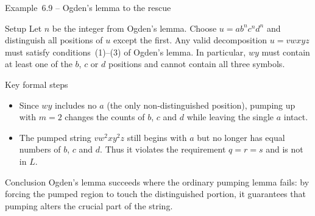\begin{frame}[t]{Example 6.9 – Ogden’s lemma to the rescue}
  \begin{tblock}{Setup}
    Let $n$ be the integer from Ogden’s lemma.  Choose
    $u = a b^n c^n d^n$ and distinguish all positions of $u$ except the
    first.  Any valid decomposition $u = v w x y z$ must satisfy
    conditions (1)–(3) of Ogden’s lemma.  In particular, $w y$ must
    contain at least one of the $b$, $c$ or $d$ positions and cannot
    contain all three symbols.
  \end{tblock}
  \begin{tblock}{Key formal steps}
    \begin{itemize}
      \item Since $w y$ includes no $a$ (the only non‑distinguished
        position), pumping up with $m=2$ changes the counts of $b$, $c$
        and $d$ while leaving the single $a$ intact.
      \item The pumped string $v w^2 x y^2 z$ still begins with $a$ but
        no longer has equal numbers of $b$, $c$ and $d$.  Thus it
        violates the requirement $q=r=s$ and is not in $L$.
    \end{itemize}
  \end{tblock}
  \begin{talert}{Conclusion}
    Ogden’s lemma succeeds where the ordinary pumping lemma fails: by
    forcing the pumped region to touch the distinguished portion, it
    guarantees that pumping alters the crucial part of the string.
  \end{talert}
  \label{fr:6.1-27}
\end{frame}

